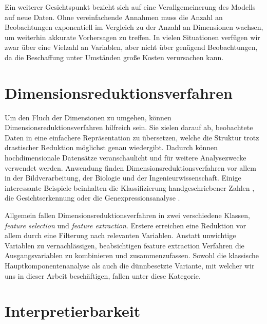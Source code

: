 Ein weiterer Gesichtspunkt bezieht sich auf eine Verallgemeinerung des Modells auf neue Daten. Ohne vereinfachende Annahmen muss die Anzahl an Beobachtungen exponentiell im Vergleich zu der Anzahl an Dimensionen wachsen, um weiterhin akkurate Vorhersagen zu treffen. In vielen Situationen verfügen wir zwar über eine Vielzahl an Variablen, aber nicht über genügend Beobachtungen, da die Beschaffung unter Umständen große Kosten verursachen kann. 




\section{Dimensionsreduktionsverfahren}

Um den Fluch der Dimensionen zu umgehen, können Dimensionsreduktionsverfahren hilfreich sein. Sie zielen darauf ab, beobachtete Daten in eine einfachere Repräsentation zu übersetzen, welche die Struktur trotz drastischer Reduktion möglichst genau wiedergibt. Dadurch können hochdimensionale Datensätze veranschaulicht und für weitere Analysezwecke verwendet werden. Anwendung finden Dimensionsreduktionsverfahren vor allem in der Bildverarbeitung, der Biologie und der Ingenieurwissenschaft. Einige interessante Beispiele beinhalten die Klassifizierung handgeschriebener Zahlen \cite{hastie_elements}, die Gesichtserkennung \cite{hancock} oder die Genexpressionsanalyse \cite{alter}.

Allgemein fallen Dimensionsreduktionsverfahren in zwei verschiedene Klassen, \textit{feature selection} und \textit{feature extraction}. Erstere erreichen eine Reduktion vor allem durch eine Filterung nach relevanten Variablen. Anstatt unwichtige Variablen zu vernachlässigen, beabsichtigen feature extraction Verfahren die Ausgangsvariablen zu kombinieren und zusammenzufassen. Sowohl die klassische Hauptkomponentenanalyse als auch die dünnbesetzte Variante, mit welcher wir uns in dieser Arbeit beschäftigen, fallen unter diese Kategorie.




\section{Interpretierbarkeit}

